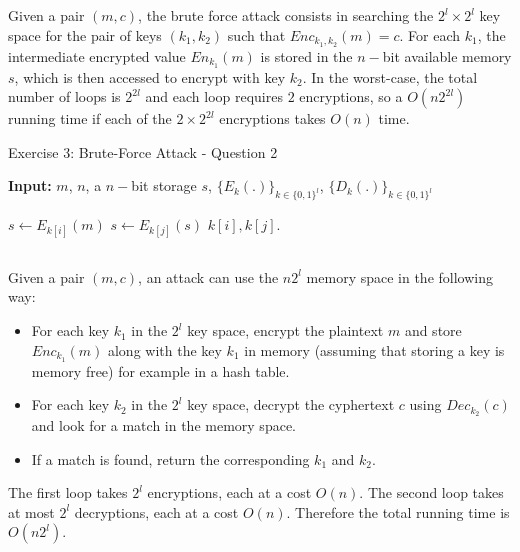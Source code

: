 \documentclass{article}
\begin{document}
\subsection{}
Given a pair $(m, c)$, the brute force attack consists in searching the $2^{l}\times 2^{l}$ key space for the pair of keys $(k_{1}, k_{2})$ such that $Enc_{k_{1}, k_{2}}(m) = c$. For each $k_{1}$, the intermediate encrypted value $En_{k_{1}}(m)$ is stored in the $n-$bit available memory $s$, which is then accessed to encrypt with key $k_{2}$. In the worst-case, the total number of loops is $2^{2l}$ and each loop requires $2$ encryptions, so a $O\left( n2^{2l}\right)$ running time if each of the $2 \times 2^{2l}$ encryptions takes $O\left(n\right)$ time. 

\begin{algorithm}[h!]
\caption{Exercise 3: Brute-Force Attack - Question 2}
\begin{algorithmic}[1]
\State \textbf{Input:}  $m$, $n$, a $n-$bit storage $s$, $\{E_{k}(.)\}_{k\in \{0,1\}^{l}}$, $\{D_{k}(.)\}_{k\in \{0,1\}^{l}}$
 

 \State$s \gets E_{k[i]}(m)$
 \State $s \gets E_{k[j]}(s)$
  $k[i], k[j]$.
 \EndIf
\EndFor
\EndFor
  

\end{algorithmic}
\end{algorithm}

\subsection{}
Given a pair $(m, c)$, an attack can use the $n 2^{l}$ memory space in the following way:
\begin{itemize}
\item For each key $k_{1}$ in the $2^{l}$ key space, encrypt the plaintext $m$ and store $Enc_{k_{1}}(m)$ along with the key $k_{1}$ in memory (assuming that storing a key is memory free) for example in a hash table.  
\item For each key $k_{2}$ in the $2^{l}$ key space, decrypt the cyphertext $c$ using $Dec_{k_{2}}(c)$ and look for a match in the memory space.
\item If a match is found, return the corresponding $k_{1}$ and $k_{2}$. 
\end{itemize}

The first loop takes $2^{l}$ encryptions, each at a cost $O(n)$. The second loop takes at most $2^{l}$ decryptions, each at a cost $O(n)$. Therefore the total running time is $O(n2^{l})$. 
\end{document}
